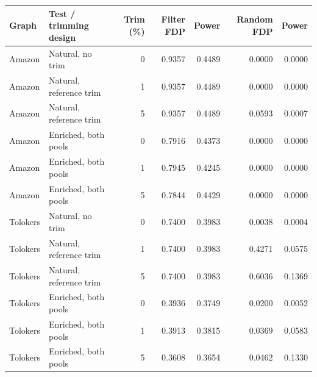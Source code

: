 \begin{tabular}{llrrrrr}\toprule
Graph & Test / trimming design & Trim (\%) & Filter FDP & Power & Random FDP & Power\\\midrule
Amazon & Natural, no trim & 0 & 0.9357 & 0.4489 & 0.0000 & 0.0000 \\
Amazon & Natural, reference trim & 1 & 0.9357 & 0.4489 & 0.0000 & 0.0000 \\
Amazon & Natural, reference trim & 5 & 0.9357 & 0.4489 & 0.0593 & 0.0007 \\
Amazon & Enriched, both pools & 0 & 0.7916 & 0.4373 & 0.0000 & 0.0000 \\
Amazon & Enriched, both pools & 1 & 0.7945 & 0.4245 & 0.0000 & 0.0000 \\
Amazon & Enriched, both pools & 5 & 0.7844 & 0.4429 & 0.0000 & 0.0000 \\
Tolokers & Natural, no trim & 0 & 0.7400 & 0.3983 & 0.0038 & 0.0004 \\
Tolokers & Natural, reference trim & 1 & 0.7400 & 0.3983 & 0.4271 & 0.0575 \\
Tolokers & Natural, reference trim & 5 & 0.7400 & 0.3983 & 0.6036 & 0.1369 \\
Tolokers & Enriched, both pools & 0 & 0.3936 & 0.3749 & 0.0200 & 0.0052 \\
Tolokers & Enriched, both pools & 1 & 0.3913 & 0.3815 & 0.0369 & 0.0583 \\
Tolokers & Enriched, both pools & 5 & 0.3608 & 0.3654 & 0.0462 & 0.1330 \\
\bottomrule\end{tabular}

